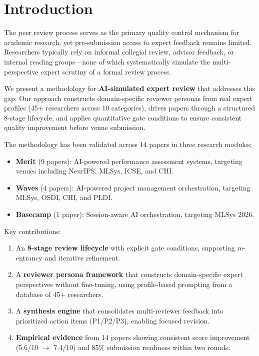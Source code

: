 \section{Introduction}

The peer review process serves as the primary quality control mechanism for academic research, yet pre-submission access to expert feedback remains limited. Researchers typically rely on informal collegial review, advisor feedback, or internal reading groups---none of which systematically simulate the multi-perspective expert scrutiny of a formal review process.

We present a methodology for \textbf{AI-simulated expert review} that addresses this gap. Our approach constructs domain-specific reviewer personas from real expert profiles (45+ researchers across 10 categories), drives papers through a structured 8-stage lifecycle, and applies quantitative gate conditions to ensure consistent quality improvement before venue submission.

The methodology has been validated across 14 papers in three research modules:
\begin{itemize}
    \item \textbf{Merit} (9 papers): AI-powered performance assessment systems, targeting venues including NeurIPS, MLSys, ICSE, and CHI.
    \item \textbf{Waves} (4 papers): AI-powered project management orchestration, targeting MLSys, OSDI, CHI, and PLDI.
    \item \textbf{Basecamp} (1 paper): Session-aware AI orchestration, targeting MLSys 2026.
\end{itemize}

\noindent Key contributions:
\begin{enumerate}
    \item An \textbf{8-stage review lifecycle} with explicit gate conditions, supporting re-entrancy and iterative refinement.
    \item A \textbf{reviewer persona framework} that constructs domain-specific expert perspectives without fine-tuning, using profile-based prompting from a database of 45+ researchers.
    \item A \textbf{synthesis engine} that consolidates multi-reviewer feedback into prioritized action items (P1/P2/P3), enabling focused revision.
    \item \textbf{Empirical evidence} from 14 papers showing consistent score improvement (5.6/10 $\to$ 7.4/10) and 85\% submission readiness within two rounds.
\end{enumerate}

